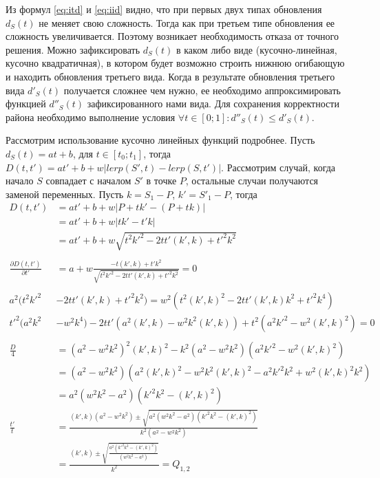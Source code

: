 Из формул \ref{eq:itd} и \ref{eq:iid} видно, что при первых двух типах
обновления $d_S(t)$ не меняет свою сложность. Тогда как при третьем
типе обновления ее сложность увеличивается. Поэтому возникает
необходимость отказа от точного решения. Можно зафиксировать
$d_S(t)$ в каком либо виде (кусочно-линейная, кусочно квадратичная),
в котором будет возможно строить нижнюю огибающую и находить обновления
третьего вида. Когда в результате обновления третьего вида $d'_S(t)$
получается сложнее чем нужно, ее необходимо аппроксимировать функцией
$d''_S(t)$ зафиксированного нами вида. Для сохранения корректности района
необходимо выполнение условия $\forall t \in [0; 1]: d''_S(t) \leq d'_S(t)$.

Рассмотрим использование кусочно линейных функций подробнее.
Пусть $d_S(t) = at + b$, для $t \in [t_0; t_1]$, тогда
$D(t, t') = at' + b + w|lerp(S', t) - lerp(S, t')|$.
Рассмотрим случай, когда начало $S$ совпадает с началом $S'$ в точке $P$,
остальные случаи получаются заменой переменных.
Пусть $k = S_1 - P$, $k' = S'_1 - P$, тогда
\[
\begin{aligned}
D(t, t') &= at' + b + w|P + tk' - (P + tk)| \\
&= at' + b + w|tk' - t'k| \\
&= at' + b + w\sqrt{t^2k'^2 - 2tt'(k', k) + t'^2k^2} \\
\\
\frac{\partial D(t, t')}{\partial t'} &= a + w\frac{-t(k', k) + t'k^2}
{\sqrt{t^2k'^2 - 2tt'(k', k) + t'^2k^2}} = 0\\
\\
a^2(t^2k'^2& - 2tt'(k', k) + t'^2k^2) = w^2(t^2(k', k)^2 - 2tt'(k', k)k^2 + t'^2k^4) \\
t'^2(a^2k^2& - w^2k^4) - 2tt'(a^2(k', k) - w^2k^2(k', k)) + t^2(a^2k'^2 - w^2(k', k)^2) = 0\\
\\
\frac{D}{4} &= (a^2 - w^2k^2)^2(k', k)^2 - k^2(a^2 - w^2k^2)(a^2k'^2 - w^2(k', k)^2)\\
&= (a^2 - w^2k^2)(a^2(k', k)^2 - w^2k^2(k', k)^2 - a^2k'^2k^2 + w^2(k', k)^2k^2)\\
&= a^2(w^2k^2 - a^2)(k'^2k^2 - (k', k)^2)\\
\frac{t'}{t} &= \frac{(k', k)(a^2 - w^2k^2) \pm \sqrt{a^2(w^2k^2 - a^2)(k'^2k^2 - (k', k)^2)}}
{k^2(a^2 - w^2k^2)}\\
&= \frac{(k', k) \pm \sqrt{\frac{a^2(k'^2k^2 - (k', k)^2)}{(w^2k^2 - a^2)}}}{k^2} = Q_{1,2}\\
\end{aligned}
\]

